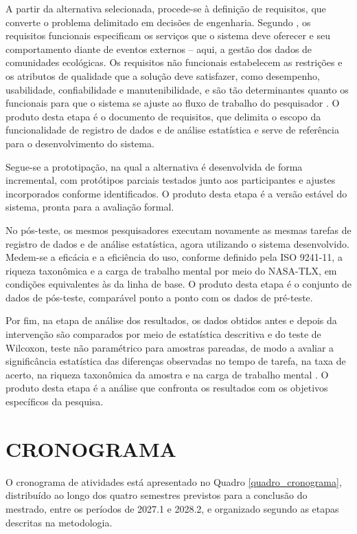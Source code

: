 \documentclass[
	12pt,				%
	oneside,			%
	a4paper,			%
	chapter=TITLE,		%
	section=TITLE,		%
	subsection=TITLE,	%
	subsubsection=TITLE,%
	english,			%
	french,				%
	spanish,			%
	brazilian,				%
	]{abntex2}
\begin{document}
A partir da alternativa selecionada, procede-se à definição de requisitos, que converte o problema delimitado em decisões de engenharia. Segundo , os requisitos funcionais especificam os serviços que o sistema deve oferecer e seu comportamento diante de eventos externos -- aqui, a gestão dos dados de comunidades ecológicas. Os requisitos não funcionais estabelecem as restrições e os atributos de qualidade que a solução deve satisfazer, como desempenho, usabilidade, confiabilidade e manutenibilidade, e são tão determinantes quanto os funcionais para que o sistema se ajuste ao fluxo de trabalho do pesquisador \cite{sommerville_software_2016}. O produto desta etapa é o documento de requisitos, que delimita o escopo da funcionalidade de registro de dados e de análise estatística e serve de referência para o desenvolvimento do sistema.

Segue-se a prototipação, na qual a alternativa é desenvolvida de forma incremental, com protótipos parciais testados junto aos participantes e ajustes incorporados conforme identificados. O produto desta etapa é a versão estável do sistema, pronta para a avaliação formal.

No pós-teste, os mesmos pesquisadores executam novamente as mesmas tarefas de registro de dados e de análise estatística, agora utilizando o sistema desenvolvido. Medem-se a eficácia e a eficiência do uso, conforme definido pela ISO 9241-11, a riqueza taxonômica e a carga de trabalho mental por meio do NASA-TLX, em condições equivalentes às da linha de base. O produto desta etapa é o conjunto de dados de pós-teste, comparável ponto a ponto com os dados de pré-teste.

Por fim, na etapa de análise dos resultados, os dados obtidos antes e depois da intervenção são comparados por meio de estatística descritiva e do teste de Wilcoxon, teste não paramétrico para amostras pareadas, de modo a avaliar a significância estatística das diferenças observadas no tempo de tarefa, na taxa de acerto, na riqueza taxonômica da amostra e na carga de trabalho mental \cite{siegel_nonparametric_1988}. O produto desta etapa é a análise que confronta os resultados com os objetivos específicos da pesquisa.


\section{CRONOGRAMA}
O cronograma de atividades está apresentado no Quadro \ref{quadro_cronograma}, distribuído ao longo dos quatro semestres previstos para a conclusão do mestrado, entre os períodos de 2027.1 e 2028.2, e organizado segundo as etapas descritas na metodologia.
\end{document}
